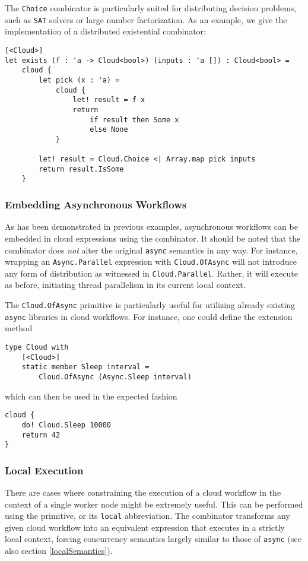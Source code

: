 The \texttt{Choice} combinator is particularly suited for distributing decision problems,
such as \texttt{SAT} solvers or large number factorization.
As an example, we give the implementation of a distributed existential combinator:
\begin{lstlisting}
[<Cloud>]
let exists (f : 'a -> Cloud<bool>) (inputs : 'a []) : Cloud<bool> =
    cloud {
        let pick (x : 'a) =
            cloud {
                let! result = f x
                return
                    if result then Some x
                    else None
            }

        let! result = Cloud.Choice <| Array.map pick inputs
        return result.IsSome 
    }
\end{lstlisting}

\subsubsection*{Embedding Asynchronous Workflows}

As has been demonstrated in previous examples, asynchronous workflows can be
embedded in cloud expressions using the
combinator. It should be noted that the combinator does \emph{not} alter the
original \texttt{async} semantics in any way. For instance, wrapping an
\texttt{Async.Parallel} expression with \texttt{Cloud.OfAsync} will not introduce
any form of distribution as witnessed in \texttt{Cloud.Parallel}. Rather,
it will execute as before, initiating thread parallelism in its current
local context.

The \texttt{Cloud.OfAsync} primitive is particularly useful for utilizing
already existing \texttt{async} libraries in cloud workflows. For instance,
one could define the extension method
\begin{lstlisting}
type Cloud with
    [<Cloud>]
    static member Sleep interval = 
    	Cloud.OfAsync (Async.Sleep interval)
\end{lstlisting}
which can then be used in the expected fashion
\begin{lstlisting}
cloud {
    do! Cloud.Sleep 10000
    return 42
}
\end{lstlisting}

\subsubsection*{Local Execution}
\label{localCombinator}

There are cases where constraining the execution of a cloud workflow in the context of a
single worker node might be extremely useful. This can be performed using the
primitive, or its \texttt{local} abbreviation. The combinator transforms any given
cloud workflow into an equivalent expression that executes in a strictly local context,
forcing concurrency semantics largely similar to those of \texttt{async} (see also section \ref{localSemantics}).

